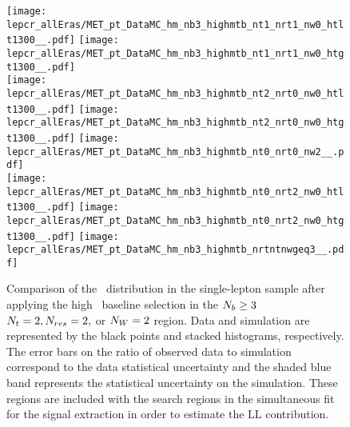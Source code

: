 \begin{figure}[!htb]
	\begin{center}
  \texttt{[image: lepcr\_allEras/MET\_pt\_DataMC\_hm\_nb3\_highmtb\_nt1\_nrt1\_nw0\_htlt1300\_\_.pdf]} 
  \texttt{[image: lepcr\_allEras/MET\_pt\_DataMC\_hm\_nb3\_highmtb\_nt1\_nrt1\_nw0\_htgt1300\_\_.pdf]} \\  
  \texttt{[image: lepcr\_allEras/MET\_pt\_DataMC\_hm\_nb3\_highmtb\_nt2\_nrt0\_nw0\_htlt1300\_\_.pdf]} 
  \texttt{[image: lepcr\_allEras/MET\_pt\_DataMC\_hm\_nb3\_highmtb\_nt2\_nrt0\_nw0\_htgt1300\_\_.pdf]} 
  \texttt{[image: lepcr\_allEras/MET\_pt\_DataMC\_hm\_nb3\_highmtb\_nt0\_nrt0\_nw2\_\_.pdf]} \\
  \texttt{[image: lepcr\_allEras/MET\_pt\_DataMC\_hm\_nb3\_highmtb\_nt0\_nrt2\_nw0\_htlt1300\_\_.pdf]} 
  \texttt{[image: lepcr\_allEras/MET\_pt\_DataMC\_hm\_nb3\_highmtb\_nt0\_nrt2\_nw0\_htgt1300\_\_.pdf]} 
  \texttt{[image: lepcr\_allEras/MET\_pt\_DataMC\_hm\_nb3\_highmtb\_nrtntnwgeq3\_\_.pdf]} \\
	\end{center}
	\caption[Lost Lepton HM Control Region $\nb\geq3$ with 2 heavy objects]{Comparison of the \met~distribution in the single-lepton sample after applying the high \dm~baseline selection in the $\nb\geq3$ $N_{t}=2, N_{res}=2,$ or $N_{W}=2$ region. Data and simulation are represented by the black points and stacked histograms, respectively. The error bars on the ratio of observed data to simulation correspond to the data statistical uncertainty and the shaded blue band represents the statistical uncertainty on the simulation. These regions are included with the search regions in the simultaneous fit for the signal extraction in order to estimate the LL contribution.
	 }
	\label{fig:llb-1lcr-datavsmc-hm-nb3-2}
\end{figure}
